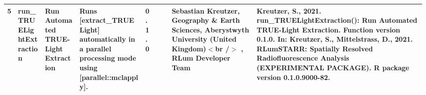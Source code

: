 \begin{table}[ht]
\begin{tabular}{rllllllll}
 \\ 
  5 & run\_TRUELightExtraction & Run Automated TRUE-Light Extraction & Runs [extract\_TRUELight] automatically in a parallel processing mode using [parallel::mclapply]. & 0.1.0
 &  &  & Sebastian Kreutzer, Geography \& Earth Sciences, Aberystwyth University (United Kingdom)$<$br /$>$ , RLum Developer Team & Kreutzer, S., 2021. run\_TRUELightExtraction(): Run Automated TRUE-Light Extraction. Function version 0.1.0. In: Kreutzer, S., Mittelstrass, D., 2021. RLumSTARR: Spatially Resolved Radiofluorescence Analysis (EXPERIMENTAL PACKAGE). R package version 0.1.0.9000-82. 
 \\ 
   \hline
\end{tabular}
\end{table}

